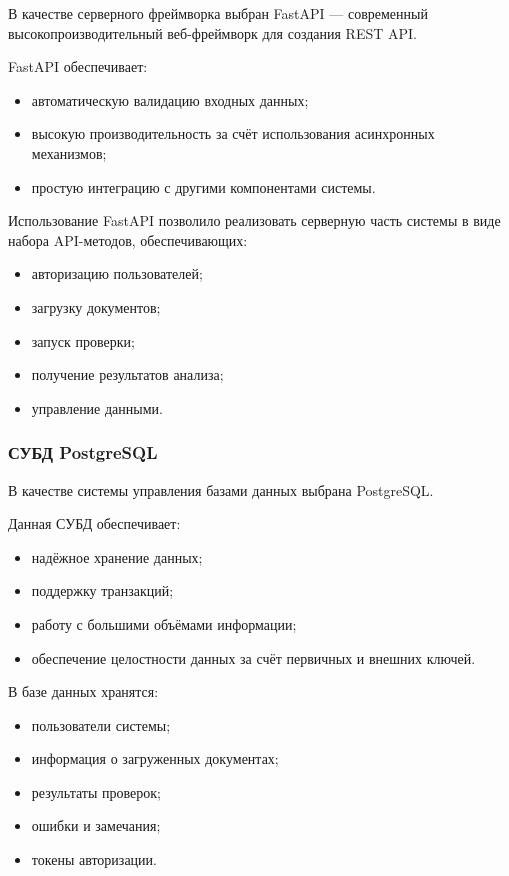 В качестве серверного фреймворка выбран FastAPI — современный высокопроизводительный веб-фреймворк для создания REST API.

FastAPI обеспечивает:
\begin{itemize}
	\item автоматическую валидацию входных данных;
	\item высокую производительность за счёт использования асинхронных механизмов;
	\item простую интеграцию с другими компонентами системы.
\end{itemize}

Использование FastAPI позволило реализовать серверную часть системы в виде набора API-методов, обеспечивающих:
\begin{itemize}
	\item авторизацию пользователей;
	\item загрузку документов;
	\item запуск проверки;
	\item получение результатов анализа;
	\item управление данными.
\end{itemize}

\subsubsection{СУБД PostgreSQL}

В качестве системы управления базами данных выбрана PostgreSQL.

Данная СУБД обеспечивает:
\begin{itemize}
	\item надёжное хранение данных;
	\item поддержку транзакций;
	\item работу с большими объёмами информации;
	\item обеспечение целостности данных за счёт первичных и внешних ключей.
\end{itemize}

В базе данных хранятся:
\begin{itemize}
	\item пользователи системы;
	\item информация о загруженных документах;
	\item результаты проверок;
	\item ошибки и замечания;
	\item токены авторизации.
\end{itemize}

